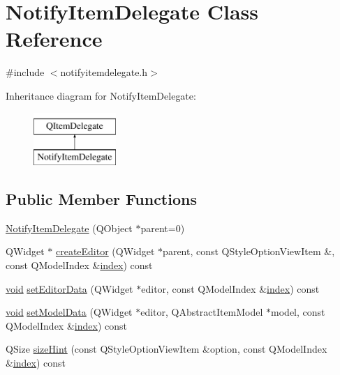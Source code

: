 \hypertarget{class_notify_item_delegate}{\section{Notify\-Item\-Delegate Class Reference}
\label{class_notify_item_delegate}
}


{\ttfamily \#include $<$notifyitemdelegate.\-h$>$}

Inheritance diagram for Notify\-Item\-Delegate\-:\begin{figure}[H]
\begin{center}
\leavevmode
\includegraphics[height=2.000000cm]{class_notify_item_delegate}
\end{center}
\end{figure}
\subsection*{Public Member Functions}
\begin{DoxyCompactItemize}
\item 
\hyperlink{group__notifyplugin_ga356769d008d39fd8dfdf8377c20ea450}{Notify\-Item\-Delegate} (Q\-Object $\ast$parent=0)
\item 
Q\-Widget $\ast$ \hyperlink{group__notifyplugin_ga5b91b80661023d558e683e9b0fadca50}{create\-Editor} (Q\-Widget $\ast$parent, const Q\-Style\-Option\-View\-Item \&, const Q\-Model\-Index \&\hyperlink{glext_8h_ab47dd9958bcadea08866b42bf358e95e}{index}) const 
\item 
\hyperlink{group___u_a_v_objects_plugin_ga444cf2ff3f0ecbe028adce838d373f5c}{void} \hyperlink{group__notifyplugin_ga75249b15c513ab2ea9691a7e2307ef19}{set\-Editor\-Data} (Q\-Widget $\ast$editor, const Q\-Model\-Index \&\hyperlink{glext_8h_ab47dd9958bcadea08866b42bf358e95e}{index}) const 
\item 
\hyperlink{group___u_a_v_objects_plugin_ga444cf2ff3f0ecbe028adce838d373f5c}{void} \hyperlink{group__notifyplugin_gacd6ffc2f5989d0a64c398e6604d72e8e}{set\-Model\-Data} (Q\-Widget $\ast$editor, Q\-Abstract\-Item\-Model $\ast$model, const Q\-Model\-Index \&\hyperlink{glext_8h_ab47dd9958bcadea08866b42bf358e95e}{index}) const 
\item 
Q\-Size \hyperlink{group__notifyplugin_ga5529e9472e4132a0066755c88969323b}{size\-Hint} (const Q\-Style\-Option\-View\-Item \&option, const Q\-Model\-Index \&\hyperlink{glext_8h_ab47dd9958bcadea08866b42bf358e95e}{index}) const 
\end{DoxyCompactItemize}


